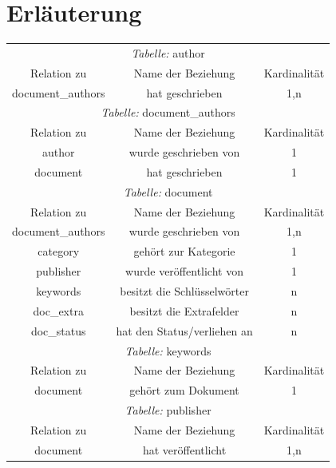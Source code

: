 \section{Erläuterung}

\begin{longtable}{@{}ccc@{}}
  \toprule
  \multicolumn{3}{c}{\emph{Tabelle:} author} \\
  Relation zu & Name der Beziehung & Kardinalität \\
  \cmidrule(lr){1-1}\cmidrule(lr){2-2}\cmidrule(lr){3-3}
  document\_authors & hat geschrieben & 1,n \\
  
  \toprule
  \multicolumn{3}{c}{\emph{Tabelle:} document\_authors} \\
  Relation zu & Name der Beziehung & Kardinalität \\
  \cmidrule(lr){1-1}\cmidrule(lr){2-2}\cmidrule(lr){3-3}
  author & wurde geschrieben von & 1\\
  document & hat geschrieben & 1\\

  \toprule
  \multicolumn{3}{c}{\emph{Tabelle:} document} \\
  Relation zu & Name der Beziehung & Kardinalität \\
  \cmidrule(lr){1-1}\cmidrule(lr){2-2}\cmidrule(lr){3-3}
  document\_authors & wurde geschrieben von & 1,n\\
  category & gehört zur Kategorie & 1\\
  publisher & wurde veröffentlicht von & 1\\
  keywords & besitzt die Schlüsselwörter & n\\  
  doc\_extra & besitzt die Extrafelder & n\\
  doc\_status & hat den Status/verliehen an & n\\

  \toprule
  \multicolumn{3}{c}{\emph{Tabelle:} keywords} \\
  Relation zu & Name der Beziehung & Kardinalität \\
  \cmidrule(lr){1-1}\cmidrule(lr){2-2}\cmidrule(lr){3-3}
  document & gehört zum Dokument & 1 \\

  \toprule
  \multicolumn{3}{c}{\emph{Tabelle:} publisher} \\
  Relation zu & Name der Beziehung & Kardinalität \\
  \cmidrule(lr){1-1}\cmidrule(lr){2-2}\cmidrule(lr){3-3}
  document & hat veröffentlicht & 1,n \\


\end{longtable}
